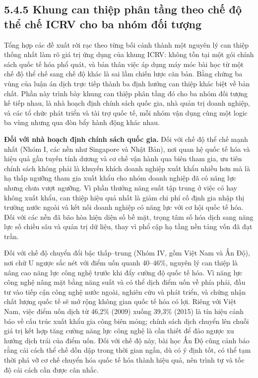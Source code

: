 \documentclass[
  a4paper,
  13pt]{extreport}
\begin{document}
\hypertarget{khung-can-thiux1ec7p-phuxe2n-tux1ea7ng-theo-chux1ebf-ux111ux1ed9-thux1ec3-chux1ebf-icrv-cho-ba-nhuxf3m-ux111ux1ed1i-tux1b0ux1ee3ng}{%
\subsection{5.4.5 Khung can thiệp phân tầng theo chế độ thể chế ICRV cho
ba nhóm đối
tượng}\label{khung-can-thiux1ec7p-phuxe2n-tux1ea7ng-theo-chux1ebf-ux111ux1ed9-thux1ec3-chux1ebf-icrv-cho-ba-nhuxf3m-ux111ux1ed1i-tux1b0ux1ee3ng}}

Tổng hợp các đề xuất rời rạc theo từng bối cảnh thành một nguyên lý can
thiệp thống nhất làm rõ giá trị ứng dụng của khung ICRV: không tồn tại
một gói chính sách quốc tế hóa phổ quát, và bản thân việc áp dụng máy
móc bài học từ một chế độ thể chế sang chế độ khác là sai lầm chiến lược
căn bản. Bằng chứng ba vùng của luận án dịch trực tiếp thành ba định
hướng can thiệp khác biệt về bản chất. Phần này trình bày khung can
thiệp phân tầng đó cho ba nhóm đối tượng kế tiếp nhau, là nhà hoạch định
chính sách quốc gia, nhà quản trị doanh nghiệp, và các tổ chức phát
triển và tài trợ quốc tế, mỗi nhóm vận dụng cùng một logic ba vùng nhưng
qua đòn bẩy hành động khác nhau.

\textbf{Đối với nhà hoạch định chính sách quốc gia.} Đối với chế độ thể
chế mạnh nhất (Nhóm I, các nền như Singapore và Nhật Bản), nơi quan hệ
quốc tế hóa và hiệu quả gần tuyến tính dương và cơ chế vận hành qua biên
tham gia, ưu tiên chính sách không phải là khuyến khích doanh nghiệp
xuất khẩu nhiều hơn mà là hạ thấp ngưỡng tham gia xuất khẩu cho nhóm
doanh nghiệp đã có năng lực nhưng chưa vượt ngưỡng. Vì phần thưởng năng
suất tập trung ở việc có hay không xuất khẩu, can thiệp hiệu quả nhất là
giảm chi phí cố định gia nhập thị trường nước ngoài và kết nối doanh
nghiệp có năng lực với cơ hội quốc tế hóa. Đối với các nền đã bão hòa
hiện diện số bề mặt, trọng tâm số hóa dịch sang năng lực số chiều sâu và
quản trị dữ liệu, thay vì phổ cập hạ tầng nền tảng vốn đã đạt trần.

Đối với chế độ chuyển đổi bậc thấp--trung (Nhóm IV, gồm Việt Nam và Ấn
Độ), nơi chữ U ngược sắc nét với điểm uốn quanh 40--46\%, nguyên lý can
thiệp là nâng cao năng lực công nghệ trước khi đẩy cường độ quốc tế hóa.
Vì năng lực công nghệ nâng mặt bằng năng suất và có thể dịch điểm uốn về
phía phải, đầu tư vào tiếp cận công nghệ nước ngoài, nghiên cứu và phát
triển, và chứng nhận chất lượng quốc tế sẽ mở rộng không gian quốc tế
hóa có lợi. Riêng với Việt Nam, việc điểm uốn dịch từ 46,2\% (2009)
xuống 39,3\% (2015) là tín hiệu cảnh báo về cấu trúc xuất khẩu gia công
biên mỏng; chính sách dịch chuyển lên chuỗi giá trị kết hợp tăng cường
năng lực công nghệ là cần thiết để đảo ngược xu hướng dịch trái của điểm
uốn. Đối với chế độ này, bài học Ấn Độ cũng cảnh báo rằng cải cách thể
chế dồn dập trong thời gian ngắn, dù có ý định tốt, có thể tạm thời phá
vỡ cơ chế chuyển hóa quốc tế hóa thành hiệu quả, nên trình tự và tốc độ
cải cách cần được cân nhắc.
\end{document}

